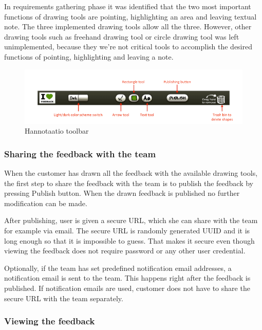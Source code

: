 \documentclass[english,12pt,a4paper,pdftex]{article}
\begin{document}
In requirements gathering phase it was identified that the two most important functions of drawing tools are pointing, highlighting an area and leaving textual note. The three implemented drawing tools allow all the three. However, other drawing tools such as freehand drawing tool or circle drawing tool was left unimplemented, because they we're not critical tools to accomplish the desired functions of pointing, highlighting and leaving a note.

\begin{figure}[htb]
\begin{center}
\includegraphics[width=1.0\textwidth]{drawing_tools_annotated_crop.png}
\end{center}
\caption{Hannotaatio toolbar}
\end{figure}

\subsubsection{Sharing the feedback with the team}

When the customer has drawn all the feedback with the available drawing tools, the first step to share the feedback with the team is to publish the feedback by pressing Publish button. When the drawn feedback is published no further modification can be made.

After publishing, user is given a secure URL, which she can share with the team for example via email. The secure URL is randomly generated UUID and it is long enough so that it is impossible to guess. That makes it secure even though viewing the feedback does not require password or any other user credential.

Optionally, if the team has set predefined notification email addresses, a notification email is sent to the team. This happens right after the feedback is published. If notification emails are used, customer does not have to share the secure URL with the team separately.

\subsubsection{Viewing the feedback}
\end{document}
